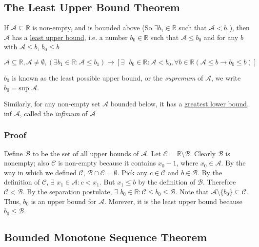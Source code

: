 \documentclass[11 pt, twoside]{article}
\begin{document}
\subsection{The Least Upper Bound Theorem}

If $\mathcal{A} \subseteq \mathbb{R}$
is non-empty, and is \underline{bounded above} (So $\exists b_1 \in \mathbb{R}$
such that $\mathcal{A} < b_1$), then $\mathcal{A}$ has a
\underline{least upper bound}, i.e. a number $b_0 \in \mathbb{R}$ such that
$\mathcal{A} \leq b_0$ and for any $b$ with $\mathcal{A} \leq b$, $b_0 \leq b$

$$\mathcal{A}\subseteq\mathbb{R}, \mathcal{A} \neq \emptyset, (\exists\text{
} b_1 \in \mathbb{R}: \mathcal{A} \leq b_1)\to[\exists\text{ } b_0 \in
\mathbb{R}: \mathcal{A} < b_0, \forall b \in \mathbb{R} (\mathcal{A} \leq
b \to b_0 \leq b)]$$

$b_0$ is known as the least possible upper bound, or the \textit{supremum} of
$\mathcal{A}$, we write $b_0 = \textrm{sup } \mathcal{A}$.


Similarly, for any non-empty set $\mathcal{A}$ bounded below, it has a
\underline{greatest lower bound}, $\textrm{inf } \mathcal{A}$, called the \textit{infimum}
of $\mathcal{A}$

\subsubsection{Proof}
Define $\mathcal{B}$ to be the set of all upper bounds of $\mathcal{A}$. Let
$\mathcal{C} = \mathbb{R} \setminus \mathcal{B}$. Clearly $\mathcal{B}$ is
nonempty; also $\mathcal{C}$ is non-empty because it contains $x_0 - 1$, where
$x_0 \in \mathcal{A}$. By the way in which we defined $\mathcal{C}$,
$\mathcal{B} \cap \mathcal{C} = \emptyset$. Pick any $c \in \mathcal{C}$ and $b
\in \mathcal{B}$. By the definition of $\mathcal{C}$, $\exists$ $x_1 \in
\mathcal{A}: c < x_1$. But $x_1 \leq b$ by the definition of $\mathcal{B}$.
Therefore $\mathcal{C} < \mathcal{B}$. By
the separation postulate, $\exists$ $b_0 \in \mathbb{R}: \mathcal{C} \leq
b_0 \leq \mathcal{B}$. Note that $\mathcal{A}\setminus\{b_0\} \subseteq
\mathcal{C}$. Thus, $b_0$ is an upper bound for $\mathcal{A}$. Morever, it is
the least upper bound because $b_0 \leq \mathcal{B}$.

\subsection{Bounded Monotone Sequence Theorem}
\end{document}
